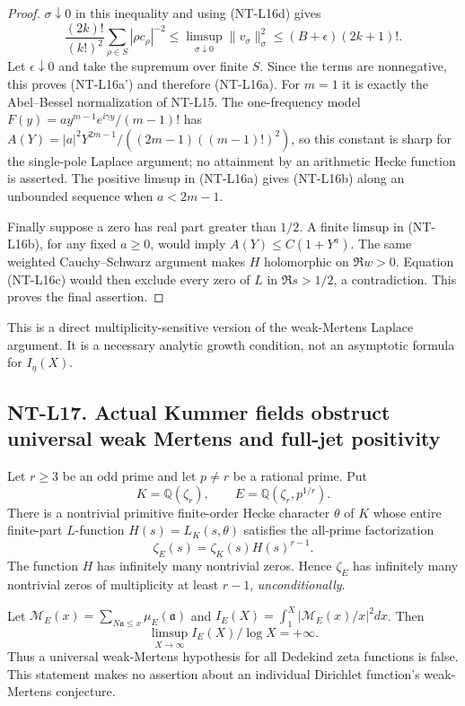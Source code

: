 \begin{proof}
$\sigma\downarrow0$ in this inequality and using (NT-L16d) gives
\[
 \frac{(2k)!}{(k!)^2}\sum_{\rho\in S}|\rho c_\rho|^{-2}
   \le \limsup_{\sigma\downarrow0}\|v_\sigma\|_\sigma^2
   \le (B+\epsilon)(2k+1)!.
\]
Let $\epsilon\downarrow0$ and take the supremum over finite $S$.
Since the terms are nonnegative, this proves (NT-L16a') and
therefore (NT-L16a). For $m=1$ it is exactly the Abel--Bessel
normalization of NT-L15. The one-frequency model
$F(y)=a y^{m-1}e^{i\gamma y}/(m-1)!$ has
$A(Y)=|a|^2Y^{2m-1}/((2m-1)((m-1)!)^2)$, so this constant is
sharp for the single-pole Laplace argument; no attainment by an
arithmetic Hecke function is asserted.
The positive limsup in (NT-L16a) gives (NT-L16b) along an unbounded sequence
when $a<2m-1$.

Finally suppose a zero has real part greater than $1/2$.
A finite limsup in (NT-L16b), for any fixed $a\ge0$, would imply
$A(Y)\le C(1+Y^a)$. The same weighted Cauchy--Schwarz argument
makes $H$ holomorphic on $\Re w>0$. Equation (NT-L16c) would then
exclude every zero of $L$ in $\Re s>1/2$, a contradiction.
This proves the final assertion.
\end{proof}
This is a direct multiplicity-sensitive version of the weak-Mertens
Laplace argument. It is a necessary analytic growth condition, not
an asymptotic formula for $I_\eta(X)$.

\subsection*{NT-L17. Actual Kummer fields obstruct universal weak Mertens and full-jet positivity}
Let $r\ge3$ be an odd prime and let $p\ne r$ be a rational prime. Put
\[
 K=\mathbb Q(\zeta_r),\qquad E=\mathbb Q(\zeta_r,p^{1/r}).
\]
There is a nontrivial primitive finite-order Hecke character $\theta$
of $K$ whose entire finite-part $L$-function $H(s)=L_K(s,\theta)$
satisfies the all-prime factorization
\[
                  \zeta_E(s)=\zeta_K(s)H(s)^{r-1}.     \tag{NT-L17a}
\]
The function $H$ has infinitely many nontrivial zeros. Hence $\zeta_E$
has infinitely many nontrivial zeros of multiplicity at least $r-1$,
\emph{unconditionally}.

Let $\mathcal M_E(x)=\sum_{N\mathfrak a\le x}\mu_E(\mathfrak a)$
and $I_E(X)=\int_1^X|\mathcal M_E(x)/x|^2dx$. Then
\[
            \limsup_{X\to\infty}I_E(X)/\log X=+\infty.
                                                        \tag{NT-L17b}
\]
Thus a universal weak-Mertens hypothesis for all Dedekind zeta
functions is false. This statement makes no assertion about an
individual Dirichlet function's weak-Mertens conjecture.

